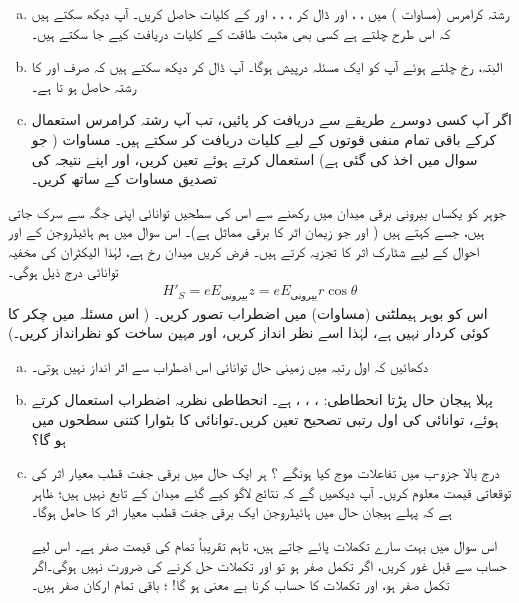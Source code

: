 \begin{enumerate}[a.]
\item
 رشتہ کرامرس (مساوات ) میں ، ،  اور  ڈال کر 
، ، ، اور 
 کے کلیات حاصل کریں۔ آپ دیکھ سکتے ہیں کہ اس طرح چلتے ہے کسی بھی مثبت طاقت کے کلیات دریافت کیے جا سکتے ہیں۔
\item
البتہ،  رخ چلتے ہوئے آپ کو ایک مسئلہ درپیش ہوگا۔ آپ  ڈال کر دیکھ سکتے ہیں کہ صرف  اور 
  کا رشتہ حاصل ہو تا ہے۔
\item
 اگر آپ کسی دوسرے طریقے سے  دریافت کر پائیں، تب آپ رشتہ کرامرس استعمال کرکے باقی تمام منفی قوتوں کے لیے کلیات دریافت کر سکتے ہیں۔
مساوات  ( جو سوال  میں اخذ کی گئی ہے) استعمال کرتے ہوئے 
تعین کریں، اور اپنے نتیجہ کی تصدیق مساوات  کے ساتھ کریں۔
\end{enumerate}
 جوہر کو یکساں بیرونی برقی میدان  میں رکھنے سے اس کی سطحیں توانائی اپنی جگہ سے سرک جاتی ہیں، جسے  کہتے ہیں ( اور جو زیمان اثر کا برقی مماثل ہے)۔ اس سوال میں ہم ہائیڈروجن کے  اور  احوال کے لیے شٹارک اثر کا تجزیہ کرتے ہیں۔ فرض کریں میدان  رخ ہے، لہٰذا الیکٹران کی مخفیہ توانائی درج ذیل ہوگی۔
\begin{align*}
H'_{S}=eE_{\text{بیرونی}}z=eE_{\text{بیرونی}}r\cos{\theta}
\end{align*}
اس کو بوہر ہیملٹنی (مساوات) میں اضطراب تصور کریں۔ ( اس مسئلہ میں چکر کا کوئی کردار نہیں ہے، لہٰذا اسے نظر انداز کریں، اور مہین ساخت کو نظرانداز کریں۔)
\begin{enumerate}[a.]
\item
 دکھائیں کہ اول رتبہ میں زمینی حال توانائی اس اضطراب سے اثر انداز نہیں ہوتی۔
\item
پہلا ہیجان حال  پڑتا انحطاطی: ، ، ،  ہے۔ انحطاطی نظریہ اضطراب استعمال کرتے ہوئے، توانائی کی اول رتبی تصحیح تعین کریں۔توانائی  کا بٹوارا کتنی سطحوں میں ہو گا؟
\item
 درج بالا جزو-ب میں  تفاعلات موج کیا ہونگے ؟ ہر ایک  حال میں برقی جفت قطب معیار اثر  کی توقعاتی قیمت معلوم کریں۔ آپ دیکھیں گے کہ نتائج لاگو کیے گئے میدان کے تابع نہیں ہیں؛ ظاہر ہے کہ پہلے ہیجان حال میں ہائیڈروجن ایک  برقی جفت قطب معیار اثر کا حامل ہوگا۔
 
  اس سوال میں بہت سارے تکملات پائے جاتے ہیں، تاہم تقریباً تمام کی قیمت صفر ہے۔ اس لیے حساب سے قبل غور کریں، اگر  تکمل صفر ہو تو  اور  تکملات حل کرنے کی ضرورت نہیں ہوگی۔اگر  تکمل صفر ہو،  اور  تکملات کا حساب کرنا بے معنی ہو گا!  ؛ باقی تمام ارکان صفر ہیں۔ 
\end{enumerate}
